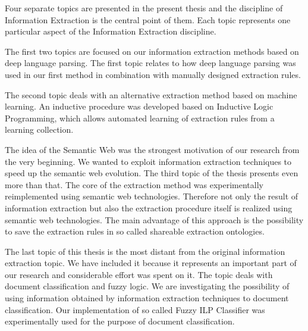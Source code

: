
\graphicspath{{../img/ch10/}}


Four separate topics are presented in the present thesis and the discipline of Information Extraction is the central point of them. Each topic represents one particular aspect of the Information Extraction discipline.

The first two topics are focused on our information extraction methods based on deep language parsing. The first topic relates to how deep language parsing was used in our first method in combination with manually designed extraction rules.

The second topic deals with an alternative extraction method based on machine learning. An inductive procedure was developed based on Inductive Logic Programming, which allows automated learning of extraction rules from a learning collection.

The idea of the Semantic Web was the strongest motivation of our research from the very beginning. We wanted to exploit information extraction techniques to speed up the semantic web evolution. The third topic of the thesis presents even more than that. The core of the extraction method was experimentally reimplemented using semantic web technologies. Therefore not only the result of information extraction but also the extraction procedure itself is realized using semantic web technologies. The main advantage of this approach is the possibility to save the extraction rules in so called shareable extraction ontologies.

The last topic of this thesis is the most distant from the original information extraction topic. We have included it because it represents an important part of our research and considerable effort was spent on it. The topic deals with document classification and fuzzy logic. We are investigating the possibility of using information obtained by information extraction techniques to document classification. Our implementation of so called Fuzzy ILP Classifier was experimentally used for the purpose of document classification.

